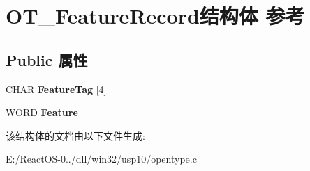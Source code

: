 \hypertarget{struct_o_t___feature_record}{}\section{O\+T\+\_\+\+Feature\+Record结构体 参考}
\label{struct_o_t___feature_record}
\subsection*{Public 属性}
\begin{DoxyCompactItemize}
\item 
\mbox{\label{struct_o_t___feature_record_a6d49cbc3d7d635afb999930d01a8cbc7}} 
C\+H\+AR {\bfseries Feature\+Tag} \mbox{[}4\mbox{]}
\item 
\mbox{\label{struct_o_t___feature_record_afb382150cf5d858a6604127418837ad5}} 
W\+O\+RD {\bfseries Feature}
\end{DoxyCompactItemize}


该结构体的文档由以下文件生成\+:\begin{DoxyCompactItemize}
\item 
E\+:/\+React\+O\+S-\/0../dll/win32/usp10/opentype.\+c\end{DoxyCompactItemize}

